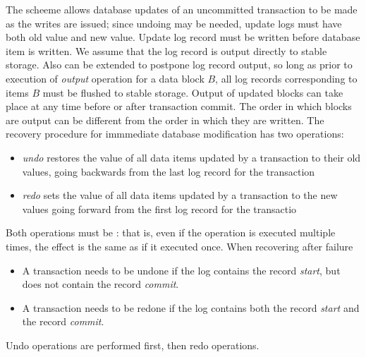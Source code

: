 \documentclass{article}
\begin{document}
The  scheeme allows database updates of an uncommitted transaction to be made as the writes are issued; since undoing may be needed, update logs must have both old value and new value. Update log record must be written before database item is written. We assume that the log record is output directly to stable storage. Also can be extended to postpone log record output, so long as prior to execution of \emph{output} operation for a data block $B$, all log records corresponding to items $B$ must be flushed to stable storage. Output of updated blocks can take place at any time before or after transaction commit. The order in which blocks are output can be different from the order in which they are written. The recovery procedure for immmediate database modification has two operations: 
\begin{itemize}
  \item \emph{undo} restores the value of all data items updated by a transaction to their old values, going backwards from the last log record for the transaction 
  \item \emph{redo} sets the value of all data items updated by a transaction to the new values going forward from the first log record for the transactio 
\end{itemize}
Both operations must be : that is, even if the operation is executed multiple times, the effect is the same as if it executed once. When recovering after failure 
\begin{itemize}
  \item A transaction needs to be undone if the log contains the record \emph{start}, but does not contain the record \emph{commit}. 
  \item A transaction needs to be redone if the log contains both the record \emph{start} and the record \emph{commit}.
\end{itemize}
Undo operations are performed first, then redo operations. \\ 
\end{document}
